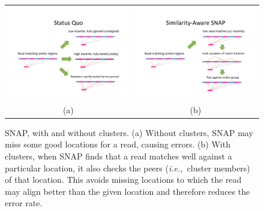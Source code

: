 \documentclass[twocolumn,10pt]{article}
\newcommand{\ie}{{\em i.e.,}~}
\begin{document}
\begin{figure}
\centering
\begin{tabular}{c c}
\includegraphics[scale=0.33]{snapWithoutClusters.pdf} & \includegraphics[scale=0.33]{simAwareSNAP.pdf}\\
(a) & (b)\\
\end{tabular}
\caption{SNAP, with and without clusters.  (a)  Without clusters, SNAP may miss some good locations for a read, causing errors.  (b)  With clusters, when SNAP finds that a read matches well against a particular location, it also checks the peers (\ie cluster members) of that location.  This avoids missing locations to which the read may align better than the given location and therefore reduces the error rate.}
\label{fig:simAwareSNAP}
\end{figure}
\end{document}
